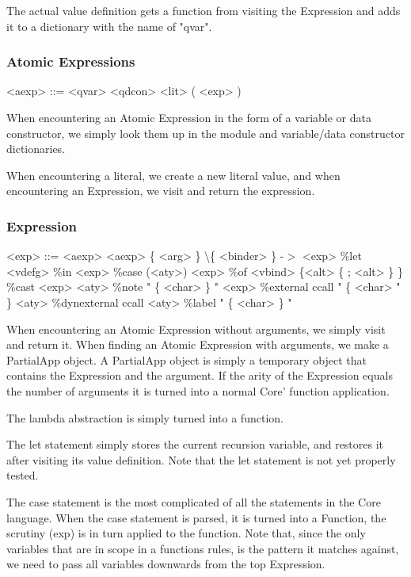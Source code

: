 The actual value definition gets a function from visiting the Expression and adds 
it to a dictionary with the name of "qvar".

\subsubsection{Atomic Expressions}

\begin{grammar}
<aexp> ::= <qvar>
      \alt <qdcon>
      \alt <lit>
      \alt ( <exp> )
\end{grammar}

When encountering an Atomic Expression in the form of a variable or data constructor, 
we simply look them up in the module and variable/data constructor dictionaries.

When encountering a literal, we create a new literal value, and when encountering an
Expression, we visit and return the expression.

\subsubsection{Expression}

\begin{grammar}
<exp> ::= <aexp>
     \alt <aexp> \{ <arg> \}
     \alt \textbackslash \{ <binder> \} -$>$ <exp>
     \alt \%let <vdefg> \%in <exp>
     \alt \%case (<aty>) <exp> \%of <vbind> \{<alt> \{ ; <alt> \}  \}
     \alt \%cast <exp> <aty>
     \alt \%note " \{ <char> \} " <exp>
     \alt \%external ccall " \{ <char> " \} <aty>
     \alt \%dynexternal ccall <aty>
     \alt \%label " \{ <char> \} "
\end{grammar}

When encountering an Atomic Expression without arguments, we simply visit and return
it. When finding an Atomic Expression with arguments, we make a PartialApp object.
A PartialApp object is simply a temporary object that contains the Expression and the
argument. If the arity of the Expression equals the number of arguments it is turned
into a normal Core' function application.

The lambda abstraction is simply turned into a function.

The let statement simply stores the current recursion variable, and restores it after
visiting its value definition. Note that the let statement is not yet properly tested.

The case statement is the most complicated of all the statements in the Core language.
When the case statement is parsed, it is turned into a Function, the scrutiny (exp) 
is in turn applied to the function. Note that, since the only variables that are in
scope in a functions rules, is the pattern it matches against, we need to pass all 
variables downwards from the top Expression.

